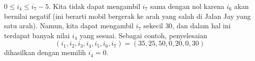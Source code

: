 \begin{exercises}
\begin{answer}
\begin{exparts}
          $0\leq i_4\leq i_7-5$.
        \partsitem Kita tidak dapat mengambil $i_7$ sama dengan nol karena $i_6$ akan
          bernilai negatif (ini berarti mobil bergerak ke arah yang salah di
          Jalan Jay yang satu arah).
          Namun, kita dapat mengambil $i_7$ sekecil $30$, dan dalam hal ini 
          terdapat banyak nilai $i_4$ yang sesuai.
          Sebagai contoh, penyelesaian
          \begin{equation*}
            (i_1,i_2,i_3,i_4,i_5,i_6,i_7)
            =
            (35,25,50,0,20,0,30)
          \end{equation*}
          dihasilkan dengan memilih $i_4=0$.
      \end{exparts}
    \end{answer}
\end{exercises}
\endinput
